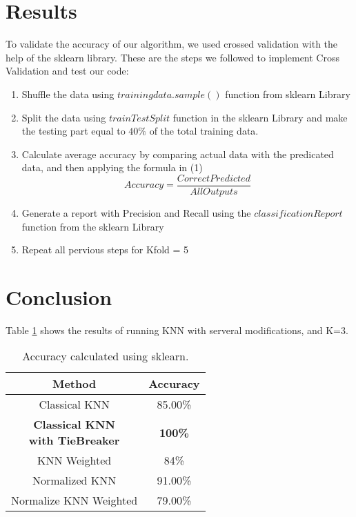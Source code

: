 \documentclass{article}
\begin{document}
 \section{Results}
To validate the accuracy of our algorithm, we used crossed validation with the help of the sklearn library. These are the steps we followed to implement Cross Validation and test our code:
 \begin{enumerate}
	\item Shuffle the data using  $ trainingdata.sample()$ function from sklearn Library 
	\item Split the data using $ trainTestSplit$ function in the sklearn Library and make the testing part equal to $40 \%$  of the total training data.
	\item Calculate average accuracy  by  comparing actual data with the predicated data, and then applying the formula in (1)
	\begin{equation}
	Accuracy = \frac{CorrectPredicted}{AllOutputs}
	\end{equation} 
	\item  Generate a report with Precision and Recall using the $classificationReport$ function from the sklearn Library
	\item Repeat all pervious steps for Kfold = 5
 \end{enumerate}
 \section{Conclusion} 
 
 
 
 Table \ref{tab:AccuarcyTable} shows the results of running  KNN with serveral modifications, and K=3.   
 
 
\setlength{\tabcolsep}{0.9em} %
{\renewcommand{\arraystretch}{1.5}%
\begin{table}[H]

\begin{tabular}{|c|c|}
\hline 
\textbf{Method}                    & \textbf{Accuracy}  \\ \hline
Classical KNN                      & 85.00\%                    
\\ \hline
  \pbox{100cm}{\textbf{Classical KNN} \\ \textbf{with TieBreaker}\\} & \textbf{100\%}                      \\\hline
KNN Weighted                       & 84\%                       \\ \hline
Normalized KNN                     & 91.00\%                    \\ \hline
Normalize KNN Weighted             & 79.00\%      
\\ \hline             
\end{tabular}
\caption{\label{tab:AccuarcyTable}Accuracy calculated using sklearn.}
\end{table}
}
\end{document}
